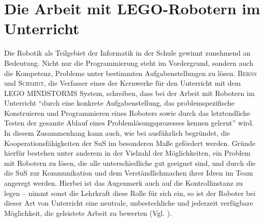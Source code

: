 \documentclass[paper=a4, pagesize, DIV=calc, BCOR=12.5mm, twoside=on, onecolumn=on, open = any, titlepage =on, parskip =half-, headsepline = on, footsepline = on, chapterprefix = on, appendixprefix = off, fontsize = 12pt, numbers = noenddot, abstract = on]{scrbook}
\numberwithin{equation}{chapter}
\theoremstyle{definition}
\theoremstyle{plain}
\theoremstyle{plain}
\theoremstyle{remark}
\theoremstyle{plain}
\theoremstyle{plain}
\begin{document}
\par \singlespacing
\section{Die Arbeit mit LEGO-Robotern im Unterricht}
\onehalfspacing
Die Robotik als Teilgebiet der Informatik in der Schule gewinnt zunehmend an Bedeutung. Nicht nur die Programmierung steht im Vordergrund, sondern auch die Kompetenz, Probleme unter bestimmten Aufgabenstellungen zu lösen. \textsc{Berns} und \textsc{Schmidt}, die Verfasser eines der Kernwerke für den Unterricht mit dem \textsc{LEGO MINDSTORMS} System, schreiben, dass bei der Arbeit mit Robotern im Unterricht "`durch eine konkrete Aufgabenstellung, das problemspezifische Konstruieren und Programmieren eines Roboters sowie durch das letztendliche Testen der gesamte Ablauf eines Problemlösungsprozesses kennen gelernt"' \cite[S.2]{berns:10} wird.\\

In diesem Zusammenhang kann auch, wie bei \cite{wagner:05} ausführlich begründet, die Kooperationsfähigkeiten der SuS im besonderen Maße gefördert werden. Gründe hierfür bestehen unter anderem in der Vielzahl der Möglichkeiten, ein Problem mit Robotern zu lösen, die alle unterschiedliche gut geeignet sind, und durch die die SuS zur Kommunikation und dem Verständlichmachen ihrer Ideen im Team angeregt werden. Hierbei ist das Augenmerk auch auf die Kontrollinstanz zu legen -- nimmt sonst die Lehrkraft diese Rolle für sich ein, so ist der Roboter bei dieser Art von Unterricht eine neutrale, unbestechliche und jederzeit verfügbare Möglichkeit, die geleistete Arbeit zu bewerten (Vgl. \cite[S.6f.]{wagner:05}).\\
\end{document}
